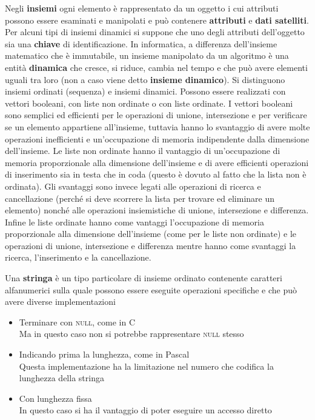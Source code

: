 \documentclass[10pt, a4paper]{report}
\begin{document}
Negli \textbf{insiemi} ogni elemento è rappresentato da un oggetto i cui attributi possono essere esaminati e manipolati e può contenere \textbf{attributi} e \textbf{dati satelliti}. Per alcuni tipi di insiemi dinamici si suppone che uno degli attributi dell'oggetto sia una \textbf{chiave} di identificazione. In informatica, a differenza dell'insieme matematico che è immutabile, un insieme manipolato da un algoritmo è una entità \textbf{dinamica} che cresce, si riduce, cambia nel tempo e che può avere elementi uguali tra loro (non a caso viene detto \textbf{insieme dinamico}). Si distinguono insiemi ordinati (sequenza) e insiemi dinamici. Possono essere realizzati con vettori booleani, con liste non ordinate o con liste ordinate. I vettori booleani sono semplici ed efficienti per le operazioni di unione, intersezione e per verificare se un elemento appartiene all'insieme, tuttavia hanno lo svantaggio di avere molte operazioni inefficienti e un'occupazione di memoria indipendente dalla dimensione dell'insieme. Le liste non ordinate hanno il vantaggio di un'occupazione di memoria proporzionale alla dimensione dell'insieme e di avere efficienti operazioni di inserimento sia in testa che in coda (questo è dovuto al fatto che la lista non è ordinata). Gli svantaggi sono invece legati alle operazioni di ricerca e cancellazione (perché si deve scorrere la lista per trovare ed eliminare un elemento) nonché alle operazioni insiemistiche di unione, intersezione e differenza. Infine le liste ordinate hanno come vantaggi l'occupazione di memoria proporzionale alla dimensione dell'insieme (come per le liste non ordinate) e le operazioni di unione, intersezione e differenza mentre hanno come svantaggi la ricerca, l'inserimento e la cancellazione.

Una \textbf{stringa} è un tipo particolare di insieme ordinato contenente caratteri alfanumerici sulla quale possono essere eseguite operazioni specifiche e che può avere diverse implementazioni
\begin{itemize}
\item Terminare con \textsc{null}, come in C\\Ma in questo caso non si potrebbe rappresentare \textsc{null} stesso
\item Indicando prima la lunghezza, come in Pascal\\Questa implementazione ha la limitazione nel numero che codifica la lunghezza della stringa
\item Con lunghezza fissa\\In questo caso si ha il vantaggio di poter eseguire un accesso diretto
\end{itemize}
\end{document}
